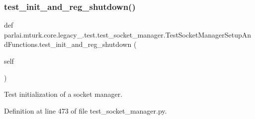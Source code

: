 \subsubsection{\texorpdfstring{test\+\_\+init\+\_\+and\+\_\+reg\+\_\+shutdown()}{test\_init\_and\_reg\_shutdown()}}
{\footnotesize\ttfamily def parlai.\+mturk.\+core.\+legacy\+\_.\+test.\+test\+\_\+socket\+\_\+manager.\+Test\+Socket\+Manager\+Setup\+And\+Functions.\+test\+\_\+init\+\_\+and\+\_\+reg\+\_\+shutdown (\begin{DoxyParamCaption}\item[{}]{self }\end{DoxyParamCaption})}

\begin{DoxyVerb}Test initialization of a socket manager.
\end{DoxyVerb}
 

Definition at line 473 of file test\+\_\+socket\+\_\+manager.\+py.


